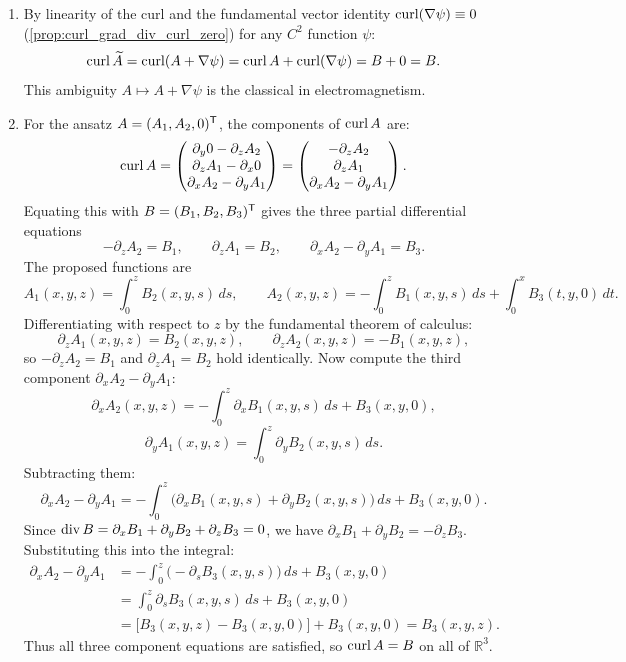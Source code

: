 \begin{exercisesolution}
\label{sol:constructing_vector_potential_divergence_free}
\begin{enumerate}[label=\textbf{(\alph*)}]
  \item By linearity of the curl and the fundamental vector identity $\operatorname{curl}(\nabla\psi) \equiv 0$
    (\cref{prop:curl_grad_div_curl_zero}) for any $C^2$ function $\psi$:
    \[\operatorname{curl} \widetilde{A} = \operatorname{curl}(A + \nabla\psi) = \operatorname{curl} A + \operatorname{curl}(\nabla\psi) = B + 0 = B.\]
    This ambiguity $A \mapsto A + \nabla\psi$ is the classical  in electromagnetism.

  \item For the ansatz $A = (A_1, A_2, 0)^{\mathsf{T}}$, the components of $\operatorname{curl} A$ are:
    \[\operatorname{curl} A = \begin{pmatrix} \partial_y 0 - \partial_z A_2 \\ \partial_z A_1 - \partial_x 0 \\ \partial_x A_2 - \partial_y A_1 \end{pmatrix}
      = \begin{pmatrix} -\partial_z A_2 \\ \partial_z A_1 \\ \partial_x A_2 - \partial_y A_1 \end{pmatrix}.\]
    Equating this with $B = (B_1, B_2, B_3)^{\mathsf{T}}$ gives the three partial differential equations
    \[-\partial_z A_2 = B_1, \qquad \partial_z A_1 = B_2, \qquad \partial_x A_2 - \partial_y A_1 = B_3.\]
    The proposed functions are
    \[A_1(x,y,z) = \int_0^z B_2(x,y,s)\,ds, \qquad
      A_2(x,y,z) = -\int_0^z B_1(x,y,s)\,ds + \int_0^x B_3(t,y,0)\,dt.\]
    Differentiating with respect to $z$ by the fundamental theorem of calculus:
    \[\partial_z A_1(x,y,z) = B_2(x,y,z), \qquad \partial_z A_2(x,y,z) = -B_1(x,y,z),\]
    so $-\partial_z A_2 = B_1$ and $\partial_z A_1 = B_2$ hold identically.
    Now compute the third component $\partial_x A_2 - \partial_y A_1$:
    \[\partial_x A_2(x,y,z) = -\int_0^z \partial_x B_1(x,y,s)\,ds + B_3(x,y,0),\]
    \[\partial_y A_1(x,y,z) = \int_0^z \partial_y B_2(x,y,s)\,ds.\]
    Subtracting them:
    \[\partial_x A_2 - \partial_y A_1 = -\int_0^z \big(\partial_x B_1(x,y,s) + \partial_y B_2(x,y,s)\big)\,ds + B_3(x,y,0).\]
    Since $\operatorname{div} B = \partial_x B_1 + \partial_y B_2 + \partial_z B_3 = 0$, we have
    $\partial_x B_1 + \partial_y B_2 = -\partial_z B_3$. Substituting this into the integral:
    \begin{align*}
      \partial_x A_2 - \partial_y A_1 &= -\int_0^z \big(-\partial_s B_3(x,y,s)\big)\,ds + B_3(x,y,0) \\
      &= \int_0^z \partial_s B_3(x,y,s)\,ds + B_3(x,y,0) \\
      &= \big[B_3(x,y,z) - B_3(x,y,0)\big] + B_3(x,y,0) = B_3(x,y,z).
    \end{align*}
    Thus all three component equations are satisfied, so $\operatorname{curl} A = B$ on all of $\mathbb{R}^3$.


\end{enumerate}
\end{exercisesolution}
